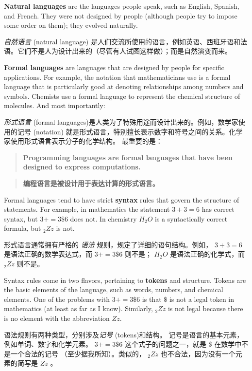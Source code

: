 {\bf Natural languages} are the languages people speak,
such as English, Spanish, and French.  They were not designed
by people (although people try to impose some order on them);
they evolved naturally.

\emph{自然语言} (natural language) 是人们交流所使用的语言，例如英语、西班牙语和法语。它们不是人为设计出来的（尽管有人试图这样做）；而是自然演变而来。

{\bf Formal languages} are languages that are designed by people for
specific applications.  For example, the notation that mathematicians
use is a formal language that is particularly good at denoting
relationships among numbers and symbols.  Chemists use a formal
language to represent the chemical structure of molecules.  And
most importantly:

\emph{形式语言} (formal languages)是人类为了特殊用途而设计出来的。例如，数学家使用的记号 (notation) 就是形式语言，特别擅长表示数字和符号之间的关系。化学家使用形式语言表示分子的化学结构。 最重要的是：

\begin{quote}
{\bf Programming languages are formal languages that have been
designed to express computations.}
\end{quote}

\begin{quote}
\textbf{编程语言是被设计用于表达计算的形式语言。}
\end{quote}

Formal languages tend to have strict {\bf syntax} rules that
govern the structure of statements.
For example, in mathematics the statement
$3 + 3 = 6$ has correct syntax, but
$3 + = 3 \$ 6$ does not.  In chemistry
$H_2O$ is a syntactically correct formula, but $_2Zz$ is not.

形式语言通常拥有严格的 \emph{语法} 规则，规定了详细的语句结构。例如， $3 + 3 = 6$ 是语法正确的数学表达式，而 $3 + = 3 \$ 6$ 则不是； $H_2O$ 是语法正确的化学式，而 $_2Zz$ 则不是。

Syntax rules come in two flavors, pertaining to {\bf tokens} and
structure.  Tokens are the basic elements of the language, such as
words, numbers, and chemical elements.  One of the problems with
$3 += 3 \$ 6$ is that \( \$ \) is not a legal token in mathematics
(at least as far as I know).  Similarly, $_2Zz$ is not legal because
there is no element with the abbreviation $Zz$.

语法规则有两种类型，分别涉及\emph{记号} (tokens)和结构。  记号是语言的基本元素，例如单词、数字和化学元素。  $3 + = 3 \$ 6$ 这个式子的问题之一，就是 \$ 在数学中不是一个合法的记号 （至少据我所知）。类似的， $_2Zz$ 也不合法，因为没有一个元素的简写是  $Zz$ 。
  

